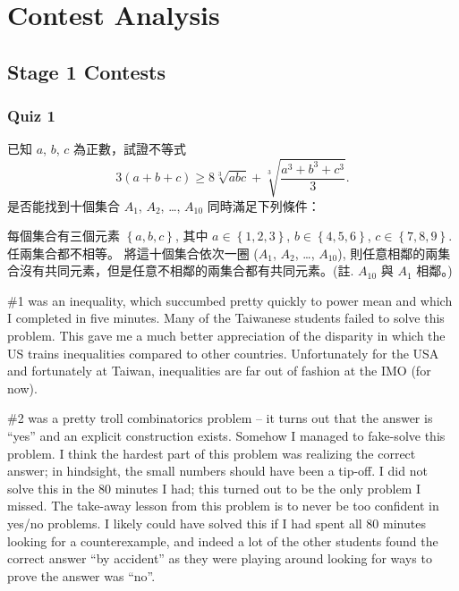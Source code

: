 \documentclass[11pt]{scrreprt}
\begin{document}
\chapter{Contest Analysis}
\section{Stage 1 Contests}
\subsection{Quiz 1}
\begin{enumerate}
  \ii 已知 $a$, $b$, $c$ 為正數，試證不等式 \[ 3(a+b+c) \ge 8\sqrt[3]{abc} + \sqrt[3]{\frac{a^3+b^3+c^3}{3}}. \]
  \ii 是否能找到十個集合 $A_1$, $A_2$, \dots, $A_{10}$ 同時滿足下列條件：
  \begin{enumerate}[(i)]
    \ii 每個集合有三個元素 $\left\{ a,b,c \right\}$, 其中 $a \in \left\{ 1,2,3 \right\}$, $b \in \left\{ 4,5,6 \right\}$, $c \in \left\{ 7,8,9 \right\}$.
    \ii 任兩集合都不相等。
    \ii 將這十個集合依次一圈 ($A_1$, $A_2$, \dots, $A_{10}$), 則任意相鄰的兩集合沒有共同元素，但是任意不相鄰的兩集合都有共同元素。(註. $A_{10}$ 與 $A_1$ 相鄰。)
  \end{enumerate}
\end{enumerate}
\#1 was an inequality, which succumbed pretty quickly to power mean and which I completed in five minutes. Many of the Taiwanese students failed to solve this problem. This gave me a much better appreciation of the disparity in which the US trains inequalities compared to other countries. Unfortunately for the USA and fortunately at Taiwan, inequalities are far out of fashion at the IMO (for now).

\#2 was a pretty troll combinatorics problem -- it turns out that the answer is ``yes'' and an explicit construction exists. Somehow I managed to fake-solve this problem. I think the hardest part of this problem was realizing the correct answer; in hindsight, the small numbers should have been a tip-off. I did not solve this in the 80 minutes I had; this turned out to be the only problem I missed.
The take-away lesson from this problem is to never be too confident in yes/no problems. I likely could have solved this if I had spent all 80 minutes looking for a counterexample, and indeed a lot of the other students found the correct answer ``by accident'' as they were playing around looking for ways to prove the answer was ``no''.
\end{document}

